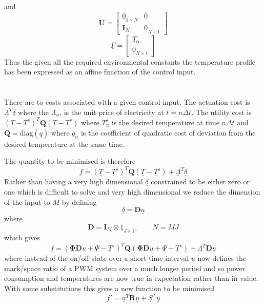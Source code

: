 \documentclass[11pt]{article}
\begin{document}
and
\begin{equation}
\mathbf{U} = \left[
\begin{array}{c|c}
\underline{0}_{1\times N} & 0 \\ \hline
\mathbf{I}_{N} & \underline{0}_{N \times 1}
\end{array}\right]
\end{equation}
\begin{equation}
\underline{\Gamma} = \left[
\begin{array}{c}
T_{0} \\ \hline
\underline{0}_{N \times 1}
\end{array}\right]
\end{equation}
Thus the given all the required environmental constants the temperature profile has been expressed as an affine function of the control input.
\section{}
There are to costs associated with a given control input. The actuation cost is $\underline{\Lambda}^{T} \underline{\delta}$ where the $\Lambda_{n}$, is the unit price of electricity at $t=n \Delta t$. The utility cost is $(\underline{T}-\underline{T}^s)^{T}\mathbf{Q}(\underline{T}-\underline{T}^s)$ where ${T}^{s}_{n}$ is the desired temperature at time $n \Delta t$ and $\mathbf{Q}=\mathrm{diag}(\underline{q})$ where $q_{n}$ is the coefficient of quadratic cost of deviation from the desired temperature at the same time.

The quantity to be minimised is therefore
\begin{equation}
f = (\underline{T}-\underline{T}^s)^{T}\mathbf{Q}(\underline{T}-\underline{T}^s)+\underline{\Lambda}^{T} \underline{\delta}
\end{equation}
Rather than having a very high dimensional $\underline{\delta}$ constrained to be either zero or one which is difficult to solve and very high dimensional we reduce the dimension of the input to $M$ by defining
\begin{equation}
\underline{\delta}=\mathbf{D}\underline{u}
\end{equation}
where
\begin{equation}
\mathbf{D}=\mathbf{I}_{M} \otimes \underline{1}_{J \times 1},\qquad N=MJ
\end{equation}
which gives
\begin{equation}
f = (\mathbf{\Phi} \mathbf{D}\underline{u}+\underline{\Psi}-\underline{T}^s)^{T}\mathbf{Q}(\mathbf{\Phi} \mathbf{D}\underline{u}+\underline{\Psi}-\underline{T}^s)+\underline{\Lambda}^{T} \mathbf{D}\underline{u}
\end{equation}
where instead of the on/off state over a short time interval $u$ now defines the mark/space ratio of a PWM system over a much longer period and so power consumption and temperatures are now true in expectation rather than in value. With some substitutions this gives a new function to be minimised
\begin{equation}
f'=\underline{u}^{T}\mathbf{R}\underline{u}+\underline{S}^{T}\underline{u}
\end{equation}
\end{document}
